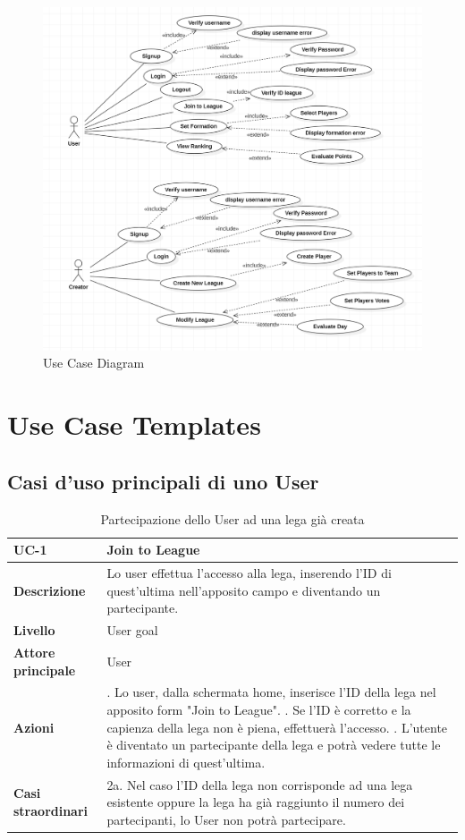 \documentclass[twoside,openright,titlepage,fleqn,headinclude,12pt,a4paper,BCOR=5mm,footinclude]{scrbook}
\begin{document}
\begin{figure}[H]
  \centering
  \includegraphics[width=0.8\linewidth]{images/useCaseDia.png}
  \caption{Use Case Diagram}
  \label{fig:Use Case Diagram}
\end{figure}


\section{Use Case Templates}


\subsection{Casi d’uso principali di uno User}

\begin{table}[H]
    \centering
    \begin{tabular}{|>{\raggedright\arraybackslash}m{2.5cm}|>{\raggedright\arraybackslash}m{10cm}|}
        \hline
        \textbf{UC-1} & \textbf{Join to League} \\
        \hline
        \textbf{Descrizione} & Lo user effettua l'accesso alla lega, inserendo l'ID di quest'ultima nell'apposito campo e diventando un partecipante. \\
        \hline
        \textbf{Livello} & User goal \\
        \hline
        \textbf{Attore principale} & User \\
        \hline
        \textbf{Azioni} & 
        1. Lo user, dalla schermata home, inserisce l'ID della lega nel apposito form "Join to League". \newline
        2. Se l'ID è corretto e la capienza della lega non è piena, effettuerà l'accesso. \newline
        3. L'utente è diventato un partecipante della lega e potrà vedere tutte le informazioni di quest'ultima. \\
        \hline
        \textbf{Casi straordinari} & 2a. Nel caso l'ID della lega non corrisponde ad una lega esistente oppure la lega ha già raggiunto il numero dei partecipanti, lo User non potrà partecipare. \\
        \hline
    \end{tabular}
    \caption{Partecipazione dello User ad una lega già creata}
    \label{tab:join_to_league}
\end{table}
\end{document}
